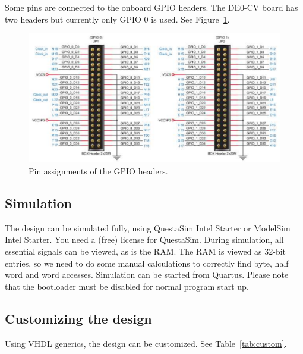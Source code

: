 \documentclass[12pt]{article}
\begin{document}
Some pins are connected to the onboard GPIO headers. The DE0-CV board has two headers but currently only GPIO 0 is used. See Figure~\ref{fig:de0-cv-gpio}.

\begin{figure}[!ht]
\centering
\includegraphics[scale=0.63]{images/de0-cv-gpio}
\caption{Pin assignments of the GPIO headers.}
\label{fig:de0-cv-gpio}
\end{figure}

\subsection{Simulation}
The design can be simulated fully, using QuestaSim Intel Starter or ModelSim Intel Starter. You need a (free) license for QuestaSim. During simulation, all essential signals can be viewed, as is the RAM. The RAM is viewed as 32-bit entries, so we need to do some manual calculations to correctly find byte, half word and word accesses. Simulation can be started from Quartus. Please note that the bootloader must be disabled for normal program start up. 

\subsection{Customizing the design}
\label{sec:customize}
Using VHDL generics, the design can be customized. See Table~\ref{tab:custom}.
\end{document}

